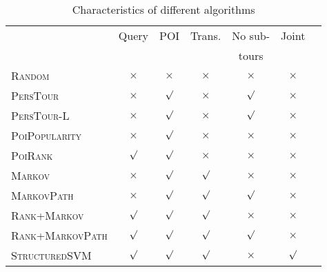 \begin{table}
\centering\small
\begin{tabular}{l|cccccc} \hline
                                    & Query    & POI      & Trans. & No sub- & Joint    \\ 
                                    &     &       &  & tours &     \\ \hline
\textsc{Random}                     & $\times$ & $\times$ & $\times$   & $\times$     & $\times$ \\ 
\textsc{PersTour}\cite{ijcai15}     & $\times$ & $\surd$  & $\times$   & $\surd$      & $\times$ \\
\textsc{PersTour-L}                 & $\times$ & $\surd$  & $\times$   & $\surd$      & $\times$ \\
\textsc{PoiPopularity}              & $\times$ & $\surd$  & $\times$   & $\times$     & $\times$ \\ 
\textsc{PoiRank}                    & $\surd$  & $\surd$  & $\times$   & $\times$     & $\times$ \\
\textsc{Markov}                     & $\times$ & $\surd$  & $\surd$    & $\times$     & $\times$ \\
\textsc{MarkovPath}                 & $\times$ & $\surd$  & $\surd$    & $\surd$      & $\times$ \\
\textsc{Rank}+\textsc{Markov}     & $\surd$  & $\surd$  & $\surd$    & $\times$     & $\times$ \\
\textsc{Rank}+\textsc{MarkovPath} & $\surd$  & $\surd$  & $\surd$    & $\surd$      & $\times$ \\
\textsc{StructuredSVM}              & $\surd$  & $\surd$  & $\surd$    & $\times$     & $\surd$  \\ \hline
\end{tabular}
\caption{Characteristics of different algorithms}
\label{table:character}
\end{table}



